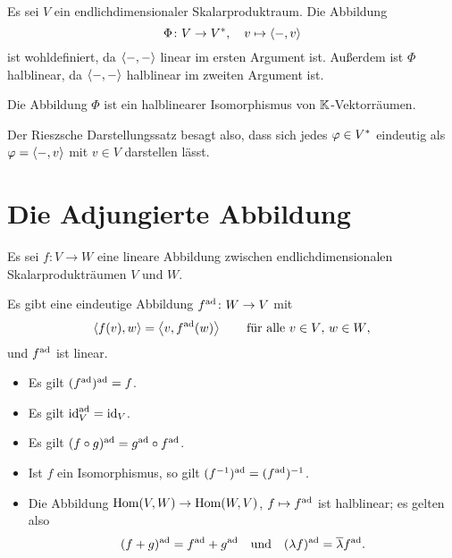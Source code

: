 Es sei $V$ ein endlichdimensionaler Skalarproduktraum.
Die Abbildung
\[
          \Phi
  \colon  V
  \to     V^*,
  \quad   v
  \mapsto \left\langle -, v \right\rangle
\]
ist wohldefiniert, da $\left\langle -, - \right\rangle$ linear im ersten Argument ist.
Außerdem ist $\Phi$ halblinear, da $\left\langle -, - \right\rangle$ halblinear im zweiten Argument ist.

\begin{theorem}
  \label{theorem: Riesz representation theorem}
  Die Abbildung $\Phi$ ist ein halblinearer Isomorphismus von $\mathbb{K}$-Vektorräumen.
\end{theorem}

Der Rieszsche Darstellungssatz besagt also, dass sich jedes $\varphi \in V^*$ eindeutig als $\varphi = \left\langle -, v \right\rangle$ mit $v \in V$ darstellen lässt.





\section{Die Adjungierte Abbildung}
\label{section: adjoint map for scalar products}

Es sei $f \colon V \to W$ eine lineare Abbildung zwischen endlichdimensionalen Skalarprodukträumen $V$ und $W$.

\begin{proposition}
  Es gibt eine eindeutige Abbildung $f^{\operatorname{ad}} \colon W \to V$ mit
  \begin{equation}
    \label{equation: definition of the adjoint map by elements for scalar products}
      \left\langle f(v), w \right\rangle
    = \left\langle v, f^{\operatorname{ad}}(w) \right\rangle
    \qquad
    \text{für alle $v \in V$, $w \in W$},
  \end{equation}
  und $f^{\operatorname{ad}}$ ist linear.
\end{proposition}

\begin{lemma}
  \leavevmode
  \begin{itemize}
    \item
      Es gilt $(f^{\operatorname{ad}})^{\operatorname{ad}} = f$.
    \item
      Es gilt $\operatorname{id}_V^{\operatorname{ad}} = \operatorname{id}_V$.
    \item
      Es gilt $(f \circ g)^{\operatorname{ad}} = g^{\operatorname{ad}} \circ f^{\operatorname{ad}}$.
    \item
      Ist $f$ ein Isomorphismus, so gilt $(f^{-1})^{\operatorname{ad}} = (f^{\operatorname{ad}})^{-1}$.
    \item
      Die Abbildung $\operatorname{Hom}(V, W) \to \operatorname{Hom}(W, V)$, $f \mapsto f^{\operatorname{ad}}$ ist halblinear;
      es gelten also
      \[
          (f + g)^{\operatorname{ad}}
        = f^{\operatorname{ad}} + g^{\operatorname{ad}}
        \quad\text{und}\quad
          (\lambda f)^{\operatorname{ad}}
        = \overline{\lambda} f^{\operatorname{ad}}.
      \]
  \end{itemize}
\end{lemma}

